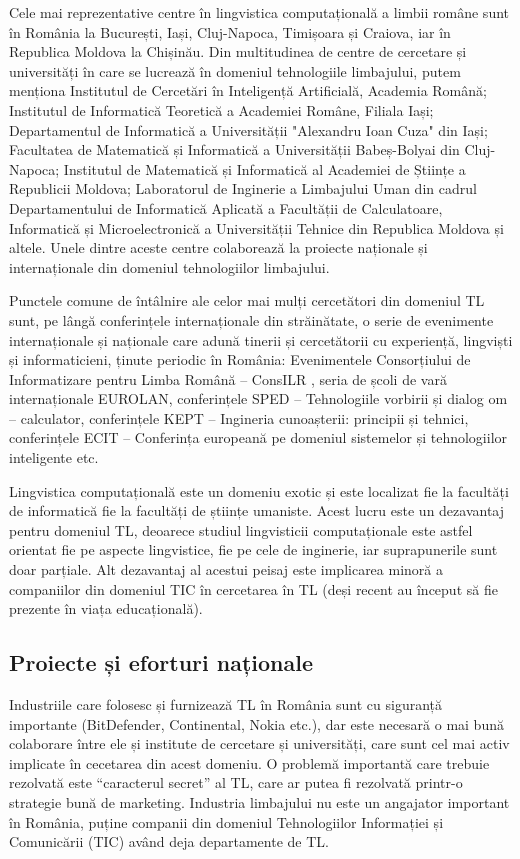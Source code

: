 \documentclass[]{../../metanetpaper}
\begin{document}
\begin{multicols}{2}
Cele mai reprezentative centre în lingvistica computațională a limbii române sunt în România la București, Iași, Cluj-Napoca, Timișoara și Craiova, iar în Republica Moldova la Chișinău. Din multitudinea de centre de cercetare și universități în care se lucrează în domeniul tehnologiile limbajului, putem menționa Institutul de Cercetări în Inteligență Artificială, Academia Română; Institutul de Informatică Teoretică a Academiei Române, Filiala Iași; Departamentul de Informatică a Universității "Alexandru Ioan Cuza" din Iași; Facultatea de Matematică și Informatică a Universității Babeș-Bolyai din Cluj-Napoca; Institutul de Matematică și Informatică al Academiei de Științe a Republicii Moldova; Laboratorul de Inginerie a Limbajului Uman din cadrul Departamentului de Informatică Aplicată a Facultății de Calculatoare, Informatică și Microelectronică a Universității Tehnice din Republica Moldova și altele. Unele dintre aceste centre colaborează la proiecte naționale și internaționale din domeniul tehnologiilor limbajului. 

Punctele comune de întâlnire ale celor mai mulți cercetători din domeniul TL sunt, pe lângă conferințele internaționale din străinătate, o serie de evenimente internaționale și naționale care adună tinerii și cercetătorii cu experiență, lingviști și informaticieni, ținute periodic în România: Evenimentele Consorțiului de Informatizare pentru Limba Română – ConsILR \cite{consilr}, seria de școli de vară internaționale EUROLAN, conferințele SPED – Tehnologiile vorbirii și dialog om – calculator, conferințele KEPT – Ingineria cunoașterii: principii și tehnici, conferințele ECIT – Conferința europeană pe domeniul sistemelor și tehnologiilor inteligente etc.

Lingvistica computațională este un domeniu exotic și este localizat fie la facultăți de informatică fie la facultăți de științe umaniste. Acest lucru este un dezavantaj pentru domeniul TL, deoarece studiul lingvisticii computaționale este astfel orientat fie pe aspecte lingvistice, fie pe cele de inginerie, iar suprapunerile sunt doar parțiale. Alt dezavantaj al acestui peisaj este implicarea minoră a companiilor din domeniul TIC în cercetarea în TL (deși recent au început să fie prezente în viața educațională).

\subsection{Proiecte și eforturi naționale}

Industriile care folosesc și furnizează TL în România sunt cu siguranță importante (BitDefender, Continental, Nokia etc.), dar este necesară o mai bună colaborare între ele și institute de cercetare și universități, care sunt cel mai activ implicate în cecetarea din acest domeniu. O problemă importantă care trebuie rezolvată este “caracterul secret” al TL, care ar putea fi rezolvată printr-o strategie bună de marketing. Industria limbajului nu este un angajator important în România, puține companii din domeniul Tehnologiilor Informației și Comunicării (TIC) având deja departamente de TL.


\end{multicols}
\end{document}
